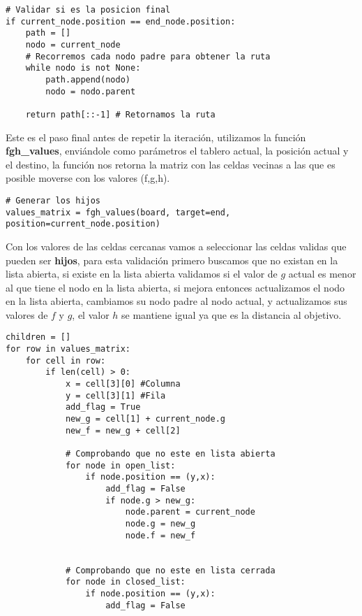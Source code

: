 \documentclass[11pt]{article}
\begin{document}
\begin{verbatim}
# Validar si es la posicion final
if current_node.position == end_node.position:
    path = []
    nodo = current_node
    # Recorremos cada nodo padre para obtener la ruta
    while nodo is not None:
        path.append(nodo)
        nodo = nodo.parent
        
    return path[::-1] # Retornamos la ruta
\end{verbatim}

Este es el paso final antes de repetir la iteración, utilizamos la
función \textbf{fgh\_values}, enviándole como parámetros el tablero
actual, la posición actual y el destino, la función nos retorna la
matriz con las celdas vecinas a las que es posible moverse con los
valores (f,g,h).

\begin{verbatim}
# Generar los hijos
values_matrix = fgh_values(board, target=end, position=current_node.position)
\end{verbatim}

Con los valores de las celdas cercanas vamos a seleccionar las celdas
validas que pueden ser \textbf{hijos}, para esta validación primero
buscamos que no existan en la lista abierta, si existe en la lista
abierta validamos si el valor de \(g\) actual es menor al que tiene el
nodo en la lista abierta, si mejora entonces actualizamos el nodo en la
lista abierta, cambiamos su nodo padre al nodo actual, y actualizamos
sus valores de \(f\) y \(g\), el valor \(h\) se mantiene igual ya que es
la distancia al objetivo.

\begin{verbatim}
children = []
for row in values_matrix:
    for cell in row:
        if len(cell) > 0:
            x = cell[3][0] #Columna
            y = cell[3][1] #Fila
            add_flag = True
            new_g = cell[1] + current_node.g
            new_f = new_g + cell[2]
            
            # Comprobando que no este en lista abierta
            for node in open_list:
                if node.position == (y,x):
                    add_flag = False
                    if node.g > new_g:
                        node.parent = current_node
                        node.g = new_g
                        node.f = new_f
                    
                    
            # Comprobando que no este en lista cerrada
            for node in closed_list:
                if node.position == (y,x):
                    add_flag = False
\end{verbatim}
\end{document}
